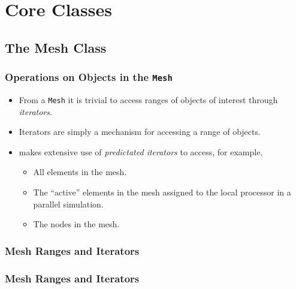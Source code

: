 \section{\libMesh{} Core Classes}

\subsection{The Mesh Class}

\begin{frame}
  \frametitle{Operations on Objects in the \texttt{Mesh}}
  \begin{block}{}
    \begin{itemize}
    \item From a \texttt{Mesh} it is trivial to access ranges of objects of interest through \emph{iterators}.
    \item Iterators are simply a mechanism for accessing a range of objects.
    \item \libMesh{} makes extensive use of \emph{predictated iterators} to access, for example,
      \begin{itemize}
        \item All elements in the mesh.
        \item The ``active'' elements in the mesh assigned to the local processor in a parallel simulation.
        \item The nodes in the mesh.
      \end{itemize}
  \end{itemize}
  \end{block}
\end{frame}

\begin{frame}[shrink]
  \frametitle{Mesh Ranges and Iterators}
  
\end{frame}

\begin{frame}[shrink]
  \frametitle{Mesh Ranges and Iterators}
  
\end{frame}



